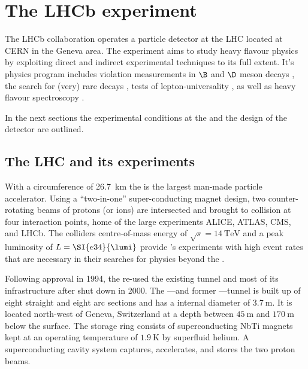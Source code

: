 
\chapter{The \acs*{LHCb} experiment}
\label{ch:lhcb_experiment}

The \acs*{LHCb} collaboration operates a particle detector at the \acs*{LHC}
located at \acs*{CERN} in the Geneva area. The \LHCb experiment aims to study heavy
flavour physics by exploiting direct and indirect experimental techniques to its
full extent. It's physics program includes \CP violation measurements in $\B$ and
$\D$ meson decays
\cite{Aaij:2015tza,Aaij:2015yda,Aaij:2014uva,Aaij:2014fba,Aaij:2014dka,Aaij:2014zsa,Aaij:2014kxa}, 
the search for (very) rare decays \cite{CMS:2014xfa}, tests of
lepton-universality \cite{Aaij:2014ora,Aaij:2015yra}, as well as heavy flavour
spectroscopy \cite{Aaij:2014yka,LHCB-PAPER-2015-029}.

In the next sections the experimental conditions at the \LHC and the design
of the \LHCb detector are outlined.

\section{The \acs*{LHC} and its experiments}
\label{sec:lhcb_experiment:lhc}

With a circumference of \SI{26.7}{\kilo\metre} the \LHC is the largest man-made
particle accelerator. Using a \enquote{two-in-one} super-conducting magnet
design, two counter-rotating beams of protons (or ions) are intersected and
brought to collision at four interaction points, home of the large \LHC
experiments \acs*{ALICE}, \acs*{ATLAS}, \acs*{CMS}, and \acs*{LHCb}. The
colliders centre-of-mass energy of $\sqrt{s}=\SI{14}{\TeV}$ and a peak
luminosity of $L=\SI{e34}{\lumi}$ provide \LHC's experiments with high event
rates that are necessary in their searches for physics beyond the \SM.

Following approval in 1994, the \LHC re-used the existing \LEP tunnel and most
of its infrastructure after \LEP shut down in 2000. The \LHC---and former
\LEP---tunnel is built up of eight straight and eight arc sections and has a
internal diameter of $\SI{3.7}{\metre}$. It is located north-west of Geneva,
Switzerland at a depth between $\SI{45}{\metre}$ and $\SI{170}{\metre}$ below
the surface. The storage ring consists of superconducting NbTi magnets kept at
an operating temperature of $\SI{1.9}{\kelvin}$ by superfluid helium. A
superconducting \RF cavity system captures, accelerates, and stores the two
proton beams.

